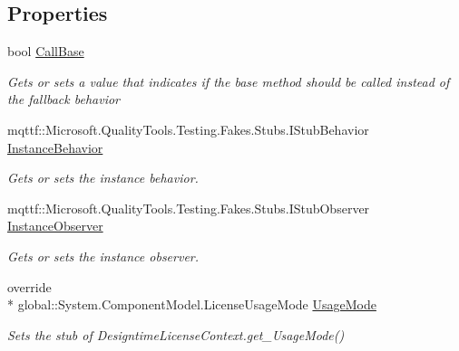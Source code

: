 \subsection*{Properties}
\begin{DoxyCompactItemize}
\item 
bool \hyperlink{class_system_1_1_component_model_1_1_design_1_1_fakes_1_1_stub_designtime_license_context_ae4504dd9199411b13200f14d8644160c}{Call\-Base}
\begin{DoxyCompactList}\small\item\em Gets or sets a value that indicates if the base method should be called instead of the fallback behavior\end{DoxyCompactList}\item 
mqttf\-::\-Microsoft.\-Quality\-Tools.\-Testing.\-Fakes.\-Stubs.\-I\-Stub\-Behavior \hyperlink{class_system_1_1_component_model_1_1_design_1_1_fakes_1_1_stub_designtime_license_context_a6ba8f83bb051ce8ed7a10066fe49fe1d}{Instance\-Behavior}
\begin{DoxyCompactList}\small\item\em Gets or sets the instance behavior.\end{DoxyCompactList}\item 
mqttf\-::\-Microsoft.\-Quality\-Tools.\-Testing.\-Fakes.\-Stubs.\-I\-Stub\-Observer \hyperlink{class_system_1_1_component_model_1_1_design_1_1_fakes_1_1_stub_designtime_license_context_a585030508dfeb1a2bbc96b59ec18abb6}{Instance\-Observer}
\begin{DoxyCompactList}\small\item\em Gets or sets the instance observer.\end{DoxyCompactList}\item 
override \\*
global\-::\-System.\-Component\-Model.\-License\-Usage\-Mode \hyperlink{class_system_1_1_component_model_1_1_design_1_1_fakes_1_1_stub_designtime_license_context_ad32361f1f9c4a1e8cc4cb7b681417f42}{Usage\-Mode}
\begin{DoxyCompactList}\small\item\em Sets the stub of Designtime\-License\-Context.\-get\-\_\-\-Usage\-Mode()\end{DoxyCompactList}\end{DoxyCompactItemize}


